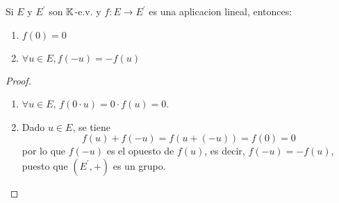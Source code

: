 \begin{proposition}
	Si \(E \) y \(E^\prime  \) son \(\mathbb{K} \)-e.v. y \(f : E \to E^\prime \) es una aplicacion lineal, entonces:
	\begin{enumerate}
		\item \(f(0) = 0 \)
		\item \(\forall u \in E, f(-u) = -f(u)\)
	\end{enumerate}
\end{proposition}
\begin{proof}
	\begin{enumerate}
		\item \(\forall u \in E \), \(f(0 \cdot u) = 0 \cdot f(u) = 0\).
		\item Dado \(u \in E \), se tiene
		      \[
			      f(u) + f(-u) = f (u + (-u)) = f(0) = 0
		      \]
		      por lo que \(f(-u )\) es el opuesto de \(f(u )\), es decir, \(f(-u) = -f(u )\), puesto que \((E^\prime, + )\) es un grupo.
	\end{enumerate}
\end{proof}

